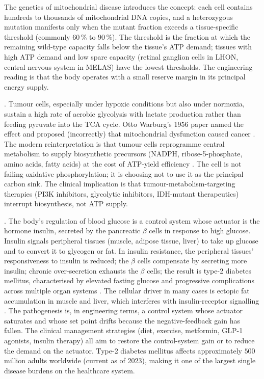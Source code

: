 The genetics of mitochondrial disease introduces the
 concept: each cell contains hundreds to
thousands of mitochondrial DNA copies, and a heterozygous mutation
manifests only when the mutant fraction exceeds a tissue-specific
threshold (commonly $60\,\%$ to $90\,\%$). The threshold is the
fraction at which the remaining wild-type capacity falls below the
tissue's ATP demand; tissues with high ATP demand and low spare
capacity (retinal ganglion cells in LHON, central nervous system in
MELAS) have the lowest thresholds. The engineering reading is that
the body operates with a small reserve margin in its principal
energy supply.

. Tumour cells, especially under hypoxic
conditions but also under normoxia, sustain a high rate of aerobic
glycolysis with lactate production rather than feeding pyruvate into
the TCA cycle. Otto Warburg's 1956 paper named the effect and
proposed (incorrectly) that mitochondrial dysfunction caused cancer
\cite{paper:v6c02-warburg-1956}. The modern reinterpretation is that
tumour cells reprogramme central metabolism to supply biosynthetic
precursors (NADPH, ribose-5-phosphate, amino acids, fatty acids) at
the cost of ATP-yield efficiency
\cite{paper:v6c02-vander-heiden-2009}. The cell is not failing
oxidative phosphorylation; it is choosing not to use it as the
principal carbon sink. The clinical implication is that
tumour-metabolism-targeting therapies (PI3K inhibitors, glycolytic
inhibitors, IDH-mutant therapeutics) interrupt biosynthesis, not
ATP supply.

. The body's regulation
of blood glucose is a control system whose actuator is the hormone
insulin, secreted by the pancreatic $\beta$ cells in response to high
glucose. Insulin signals peripheral tissues (muscle, adipose tissue,
liver) to take up glucose and to convert it to glycogen or fat. In
insulin resistance, the peripheral tissues' responsiveness to insulin
is reduced; the $\beta$ cells compensate by secreting more insulin;
chronic over-secretion exhausts the $\beta$ cells; the result is
type-2 diabetes mellitus, characterised by elevated fasting glucose
and progressive complications across multiple organ systems
\cite{paper:v6c02-defronzo-diabetes-2009}. The cellular driver in
many cases is ectopic fat accumulation in muscle and liver, which
interferes with insulin-receptor signalling
\cite{paper:v6c02-shulman-diabetes-2014}. The pathogenesis is, in
engineering terms, a control system whose actuator saturates and
whose set point drifts because the negative-feedback gain has fallen.
The clinical management strategies (diet, exercise, metformin, GLP-1
agonists, insulin therapy) all aim to restore the control-system gain
or to reduce the demand on the actuator. Type-2 diabetes mellitus
affects approximately $500$ million adults worldwide (current as of
2023), making it one of the largest single disease burdens on the
healthcare system.

